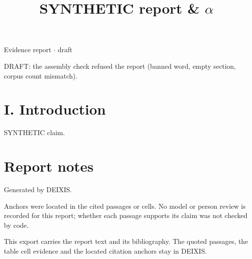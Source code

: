 \documentclass[journal]{IEEEtran}
\begin{document}
\title{SYNTHETIC report \& \ensuremath{\alpha}}

\maketitle

\noindent Evidence report \ensuremath{\cdot} draft

\noindent DRAFT: the assembly check refused the report (banned word, empty section, corpus count mismatch).

\section*{I. Introduction}

SYNTHETIC claim. \cite{Synth26}

\section*{Report notes}

Generated by DEIXIS.

Anchors were located in the cited passages or cells. No model or person review is recorded for this report; whether each passage supports its claim was not checked by code.

This export carries the report text and its bibliography. The quoted passages, the table cell evidence and the located citation anchors stay in DEIXIS.




\end{document}
